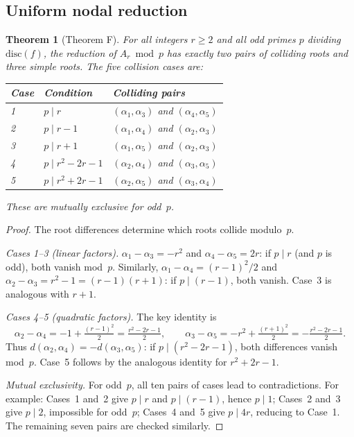 \documentclass[11pt]{amsart}
\theoremstyle{plain}
\newtheorem{theorem}{Theorem}[section]
\theoremstyle{definition}
\theoremstyle{remark}
\begin{document}
\subsection{Uniform nodal reduction}\label{ssec:nodal}

\begin{theorem}[Theorem F]\label{thm:F}
For all integers $r\ge 2$ and all odd primes $p$ dividing $\mathrm{disc}(f)$,
the reduction of $A_r\bmod p$ has exactly two pairs of colliding roots and three
simple roots.  The five collision cases are:
\begin{center}
\begin{tabular}{lll}
\toprule
Case & Condition & Colliding pairs \\
\midrule
1 & $p\mid r$           & $(\alpha_1,\alpha_3)$ and $(\alpha_4,\alpha_5)$ \\
2 & $p\mid r{-}1$       & $(\alpha_1,\alpha_4)$ and $(\alpha_2,\alpha_3)$ \\
3 & $p\mid r{+}1$       & $(\alpha_1,\alpha_5)$ and $(\alpha_2,\alpha_3)$ \\
4 & $p\mid r^2{-}2r{-}1$ & $(\alpha_2,\alpha_4)$ and $(\alpha_3,\alpha_5)$ \\
5 & $p\mid r^2{+}2r{-}1$ & $(\alpha_2,\alpha_5)$ and $(\alpha_3,\alpha_4)$ \\
\bottomrule
\end{tabular}
\end{center}
These are mutually exclusive for odd~$p$.
\end{theorem}

\begin{proof}
The root differences determine which roots collide modulo~$p$.

\emph{Cases 1--3 (linear factors).}
$\alpha_1-\alpha_3=-r^2$ and $\alpha_4-\alpha_5=2r$: if $p\mid r$
(and $p$ is odd), both vanish mod~$p$.
Similarly, $\alpha_1-\alpha_4=(r{-}1)^2/2$ and $\alpha_2-\alpha_3=r^2-1=(r{-}1)(r{+}1)$:
if $p\mid(r{-}1)$, both vanish.  Case~3 is analogous with $r{+}1$.

\emph{Cases 4--5 (quadratic factors).}
The key identity is
\[
  \alpha_2-\alpha_4 = -1+\tfrac{(r{-}1)^2}{2} = \tfrac{r^2-2r-1}{2},\qquad
  \alpha_3-\alpha_5 = -r^2+\tfrac{(r{+}1)^2}{2} = -\tfrac{r^2-2r-1}{2}.
\]
Thus $d(\alpha_2,\alpha_4)=-d(\alpha_3,\alpha_5)$: if $p\mid(r^2{-}2r{-}1)$,
both differences vanish mod~$p$.  Case~5 follows by the analogous
identity for $r^2{+}2r{-}1$.

\emph{Mutual exclusivity.}
For odd~$p$, all ten pairs of cases lead to contradictions.
For example: Cases~1 and~2 give $p\mid r$ and $p\mid(r{-}1)$, hence $p\mid 1$;
Cases~2 and~3 give $p\mid 2$, impossible for odd~$p$;
Cases~4 and~5 give $p\mid 4r$, reducing to Case~1.
The remaining seven pairs are checked similarly.
\end{proof}
\end{document}
